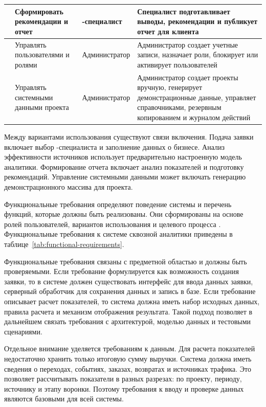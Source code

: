{\begin{longtable}{|P{0.11\textwidth}|P{0.27\textwidth}|P{0.18\textwidth}|P{0.34\textwidth}|}
    \hline
     & Сформировать рекомендации и отчет & -специалист & Специалист подготавливает выводы, рекомендации и публикует отчет для клиента \\
    \hline
     & Управлять пользователями и ролями & Администратор & Администратор создает учетные записи, назначает роли, блокирует или активирует пользователей \\
    \hline
     & Управлять системными данными проекта & Администратор & Администратор создает проекты вручную, генерирует демонстрационные данные, управляет справочниками, резервным копированием и журналом действий \\
    \hline
\end{longtable}
}

Между вариантами использования существуют связи включения. Подача заявки включает выбор -специалиста и заполнение данных о бизнесе. Анализ эффективности источников использует предварительно настроенную модель аналитики. Формирование отчета включает анализ показателей и подготовку рекомендаций. Управление системными данными может включать генерацию демонстрационного массива для проекта.

Функциональные требования определяют поведение системы и перечень функций, которые должны быть реализованы. Они сформированы на основе ролей пользователей, вариантов использования и целевого процесса . Функциональные требования к системе сквозной аналитики приведены в таблице~\ref{tab:functional-requirements}.

Функциональные требования связаны с предметной областью и должны быть проверяемыми. Если требование формулируется как возможность создания заявки, то в системе должен существовать интерфейс для ввода данных заявки, серверный обработчик для сохранения данных и запись в базе. Если требование описывает расчет показателей, то система должна иметь набор исходных данных, правила расчета и механизм отображения результата. Такой подход позволяет в дальнейшем связать требования с архитектурой, моделью данных и тестовыми сценариями.

Отдельное внимание уделяется требованиям к данным. Для расчета показателей недостаточно хранить только итоговую сумму выручки. Система должна иметь сведения о переходах, событиях, заказах, возвратах и источниках трафика. Это позволяет рассчитывать показатели в разных разрезах: по проекту, периоду, источнику и этапу воронки. Поэтому требования к вводу и проверке данных являются базовыми для всей системы.

